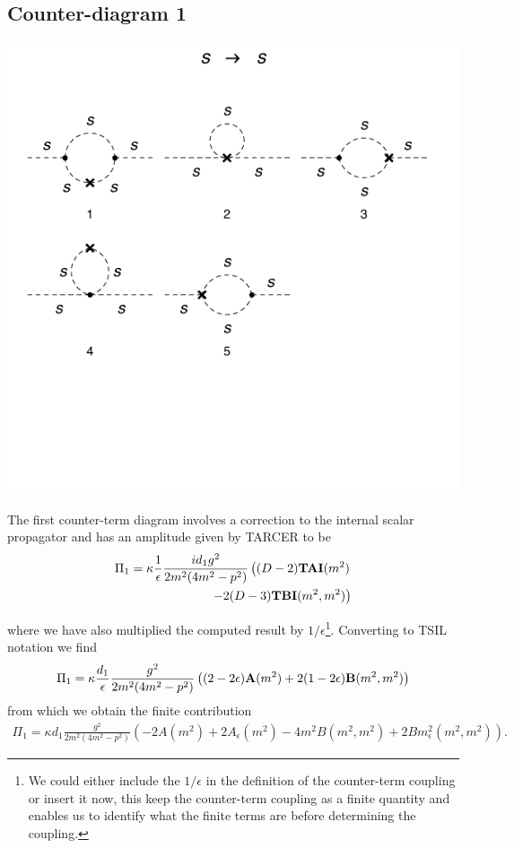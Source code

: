 \documentclass[11pt]{article}
\newcommand{\tsil}{\textsf{TSIL} \! }
\begin{document}
 \subsection*{Counter-diagram 1}
 \noindent\begin{minipage}{0.3\textwidth}
\begin{center}
\includegraphics{2loop_1c.pdf}
\end{center}
\end{minipage}
\noindent\begin{minipage}{0.7\textwidth}
The first counter-term diagram involves a correction to the internal scalar propagator and has an amplitude given by TARCER to be
 \begin{align}
 \begin{split}
 \Pi_1 = \kappa\frac{ 1 }{\epsilon} \frac{i  d_1 g^2}{ 2 m^2 (4m^2-p^2)} \left( (D-2){\tt{\mathbf{TAI}}}(m^2)\right.&\\
 \left.-2(D-3){\tt{\mathbf{TBI}}}(m^2,m^2) \right)&
 \end{split}
 \end{align}
  \end{minipage}
where we have also multiplied the computed result by $1/\epsilon$\footnote{We could either include the $1/\epsilon$ in the definition of the counter-term coupling or insert it now, this keep the counter-term coupling as a finite quantity and enables us to identify what the finite terms are before determining the coupling.}.  Converting to \tsil notation we find
  \begin{align}
 \Pi_1 = \kappa \frac{ d_1 }{\epsilon}\frac{g^2}{ 2 m^2 (4m^2-p^2)} \left( (2-2\epsilon){\tt{\mathbf{A}}}(m^2)+2(1-2\epsilon){\tt{\mathbf{B}}}(m^2,m^2) \right)  
 \end{align}
 from which we obtain the finite contribution
 \begin{align}
 \Pi_1 = \kappa d_1 \frac{g^2}{ 2 m^2 (4m^2-p^2)} \left( -2 A(m^2)+2A_{\epsilon}(m^2)-4m^2B(m^2,m^2)+2Bm^2_{\epsilon}(m^2,m^2)\right).
 \end{align}
 
\end{document}
